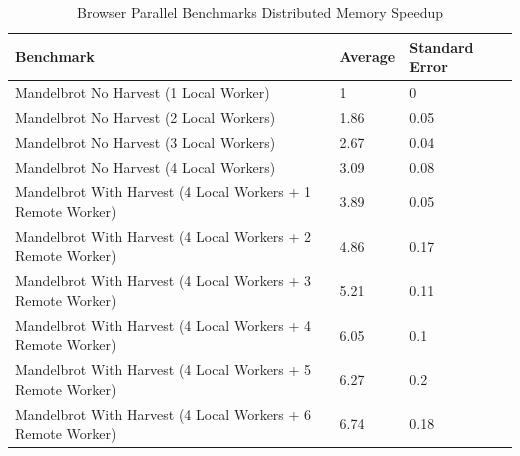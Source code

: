 \documentclass[oneside]{um-fict}
\begin{document}
\begin{table}[H]
    \begin{center}
        \begin{tabular}{|l|ll|}
            \hline
            Benchmark                                                   & Average & Standard Error \\ \hline
            Mandelbrot No Harvest (1 Local Worker)                      & 1       & 0              \\
            Mandelbrot No Harvest (2 Local Workers)                     & 1.86    & 0.05           \\
            Mandelbrot No Harvest (3 Local Workers)                     & 2.67    & 0.04           \\
            Mandelbrot No Harvest (4 Local Workers)                     & 3.09    & 0.08           \\
            Mandelbrot With Harvest (4 Local Workers + 1 Remote Worker) & 3.89    & 0.05           \\
            Mandelbrot With Harvest (4 Local Workers + 2 Remote Worker) & 4.86    & 0.17           \\
            Mandelbrot With Harvest (4 Local Workers + 3 Remote Worker) & 5.21    & 0.11           \\
            Mandelbrot With Harvest (4 Local Workers + 4 Remote Worker) & 6.05    & 0.1            \\
            Mandelbrot With Harvest (4 Local Workers + 5 Remote Worker) & 6.27    & 0.2            \\
            Mandelbrot With Harvest (4 Local Workers + 6 Remote Worker) & 6.74    & 0.18           \\ \hline
        \end{tabular}
        \caption{Browser Parallel Benchmarks Distributed Memory Speedup}\label{tab:browserdistributedmemoryspeedup}
    \end{center}
\end{table}
\end{document}
